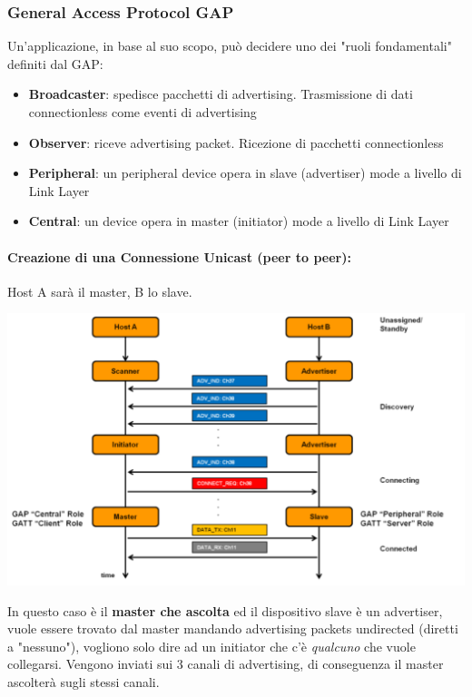 \subsubsection{General Access Protocol GAP}
Un'applicazione, in base al suo scopo, può decidere uno dei "ruoli fondamentali" definiti dal GAP:
\begin{itemize}
	\item \textbf{Broadcaster}: spedisce pacchetti di advertising. Trasmissione di dati connectionless come eventi di advertising
	\item \textbf{Observer}: riceve advertising packet. Ricezione di pacchetti connectionless
	\item \textbf{Peripheral}: un peripheral device opera in slave (advertiser) mode a livello di Link Layer
	\item \textbf{Central}: un device opera in master (initiator) mode a livello di Link Layer
\end{itemize}

\paragraph{Creazione di una Connessione Unicast (peer to peer):} Host A sarà il master, B lo slave.
\begin{center}
	\includegraphics[width=0.98\linewidth]{img/wpan/bleunicast}
\end{center}
In questo caso è il \textbf{master che ascolta} ed il dispositivo slave è un advertiser, vuole essere trovato dal master mandando advertising packets undirected (diretti a "nessuno"), vogliono solo dire ad un initiator che c'è \textit{qualcuno} che vuole collegarsi. Vengono inviati sui 3 canali di advertising, di conseguenza il master ascolterà sugli stessi canali.

